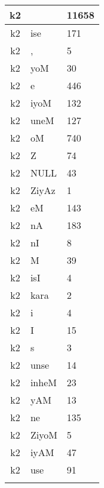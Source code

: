 \documentclass[a4 paper]{article}
\begin{document}
\begin{longtable}{cp{}p{}}
k2 &  & 11658\\ \midrule k2 & ise & 171\\ \midrule k2 & , & 5\\ \midrule k2 & yoM & 30\\ \midrule k2 & e & 446\\ \midrule k2 & iyoM & 132\\ \midrule k2 & uneM & 127\\ \midrule k2 & oM & 740\\ \midrule k2 & Z & 74\\ \midrule k2 & NULL & 43\\ \midrule k2 & ZiyAz & 1\\ \midrule k2 & eM & 143\\ \midrule k2 & nA & 183\\ \midrule k2 & nI & 8\\ \midrule k2 & M & 39\\ \midrule k2 & isI & 4\\ \midrule k2 & kara & 2\\ \midrule k2 & i & 4\\ \midrule k2 & I & 15\\ \midrule k2 & s & 3\\ \midrule k2 & unse & 14\\ \midrule k2 & inheM & 23\\ \midrule k2 & yAM & 13\\ \midrule k2 & ne & 135\\ \midrule k2 & ZiyoM & 5\\ \midrule k2 & iyAM & 47\\ \midrule k2 & use & 91\\ \m
\end{longtable}
\end{document}
